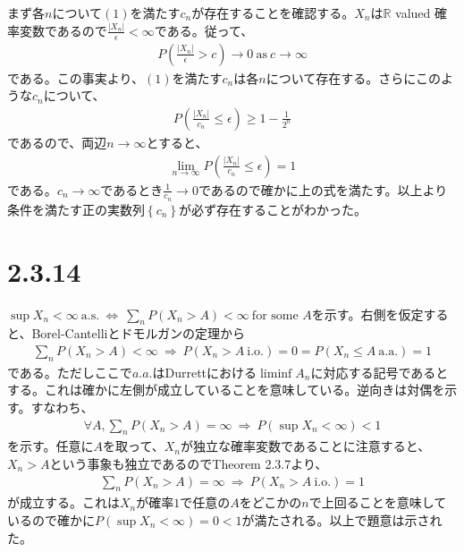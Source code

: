 \documentclass{article}
\begin{document}
まず各$n$について$(1)$を満たす$c_n$が存在することを確認する。$X_n$は$\mathbb{R}$ valued 確率変数であるので$\frac{|X_n|}{\epsilon} < \infty$である。従って、
\begin{align*}
	P\left( \frac{|X_n|}{\epsilon} > c \right)\to 0\ \text{as}\ c\to \infty
\end{align*}
である。この事実より、$(1)$を満たす$c_n$は各$n$について存在する。さらにこのような$c_n$について、
\begin{align*}
	P\left( \frac{|X_n|}{c_n} \leq \epsilon \right) \geq 1-\frac{1}{2^n}
\end{align*}
であるので、両辺$n\to \infty$とすると、
\begin{align*}
	\lim_{n\to \infty} P\left( \frac{|X_n|}{c_n} \leq \epsilon \right)= 1
\end{align*}
である。$c_n \to \infty$であるとき$\frac{1}{c_n} \to 0$であるので確かに上の式を満たす。以上より条件を満たす正の実数列$\left\{ c_n \right\}$が必ず存在することがわかった。

\section{2.3.14}
$\sup X_n < \infty\ \text{a.s.}\ \Leftrightarrow\ \sum_n P\left( X_n > A \right) < \infty\ \text{for some $A$}$を示す。右側を仮定すると、Borel-Cantelliとドモルガンの定理から
\begin{align*}
	\sum_n P\left( X_n > A \right) < \infty\ \Rightarrow\ P\left( X_n > A\ \text{i.o.} \right) = 0 = P\left( X_n \leq A\ \text{a.a.} \right) = 1
\end{align*}
である。ただしここで$a.a.$はDurrettにおける$\liminf A_n$に対応する記号であるとする。これは確かに左側が成立していることを意味している。逆向きは対偶を示す。すなわち、
\begin{align*}
	\forall A, \sum_n P\left( X_n > A \right) = \infty\ \Rightarrow\ P\left( \sup X_n < \infty \right) < 1
\end{align*}
を示す。任意に$A$を取って、$X_n$が独立な確率変数であることに注意すると、$X_n > A$という事象も独立であるのでTheorem 2.3.7より、
\begin{align*}
	\sum_n P\left( X_n > A \right) = \infty\ \Rightarrow\ P\left( X_n > A\ \text{i.o.} \right) = 1
\end{align*}
が成立する。これは$X_n$が確率$1$で任意の$A$をどこかの$n$で上回ることを意味しているので確かに$P\left( \sup X_n < \infty \right) = 0 < 1$が満たされる。以上で題意は示された。
\end{document}
